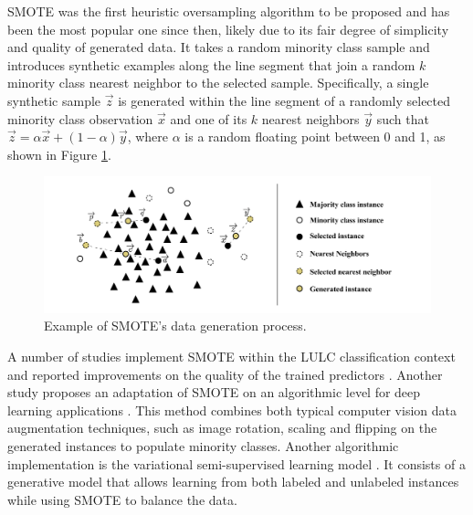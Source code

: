 \documentclass[parskip=full]{scrartcl}
\begin{document}
SMOTE \cite{Chawla2002} was the first heuristic oversampling algorithm to be
proposed and has been the most popular one since then, likely due to its fair
degree of simplicity and quality of generated data. It takes a random minority
class sample and introduces synthetic examples along the line segment that join
a random $k$ minority class nearest neighbor to the selected sample.
Specifically, a single synthetic sample $\overrightarrow{z}$ is generated within
the line segment of a randomly selected minority class observation
$\overrightarrow{x}$ and one of its $k$ nearest neighbors $\overrightarrow{y}$
such that $\overrightarrow{z} =
\alpha\overrightarrow{x}+(1-\alpha)\overrightarrow{y}$, where $\alpha$ is a
random floating point between 0 and 1, as shown in Figure
\ref{fig:smote_example}.

\begin{figure}[H]
	\centering
	\includegraphics[width=1\linewidth]{../analysis/smote_example}
	\caption{Example of SMOTE's data generation process.}
	\label{fig:smote_example}
\end{figure}

A number of studies implement SMOTE within the LULC classification context and
reported improvements on the quality of the trained predictors
\cite{Jozdani2019, Bogner2018}. Another study proposes an adaptation of SMOTE on
an algorithmic level for deep learning applications \cite{Zhu2020}. This method
combines both typical computer vision data augmentation techniques, such as
image rotation, scaling and flipping on the generated instances to populate
minority classes. Another algorithmic implementation is the variational
semi-supervised learning model \cite{Cenggoro2018}. It consists of a generative
model that allows learning from both labeled and unlabeled instances while
using SMOTE to balance the data.
\end{document}
